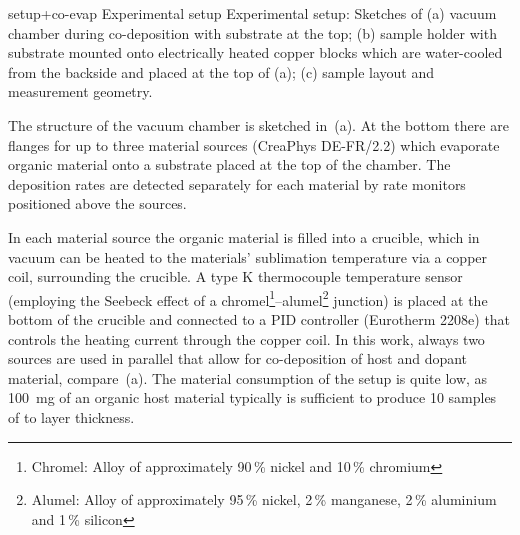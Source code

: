 \cBildDraw
{setup+co-evap}
{Experimental setup}
{Experimental setup: Sketches of (a) vacuum chamber during co-deposition with substrate at the top; (b) sample holder with substrate mounted onto electrically heated copper blocks which are water-cooled from the backside and placed at the top of (a); (c) sample layout and measurement geometry.}

The structure of the vacuum chamber is sketched in \,(a). At the bottom there are flanges for up to three material sources (CreaPhys DE-FR/2.2) which evaporate organic material onto a substrate placed at the top of the chamber. The deposition rates are detected separately for each material by rate monitors positioned above the sources.

In each material source the organic material is filled into a crucible, which in vacuum can be heated to the materials' sublimation temperature via a copper coil, surrounding the crucible. A type K thermocouple temperature sensor (employing the Seebeck effect of a chromel\footnote{Chromel: Alloy of approximately 90\,\% nickel and 10\,\% chromium}--alumel\footnote{Alumel: Alloy of approximately 95\,\% nickel, 2\,\% manganese, 2\,\% aluminium and 1\,\% silicon} junction) is placed at the bottom of the crucible and connected to a PID controller (Eurotherm 2208e) that controls the heating current through the copper coil.
In this work, always two sources are used in parallel that allow for co-deposition of host and dopant material, compare \,(a). The material consumption of the setup is quite low, as \SI{100}{\milli\gram} of an organic host material typically is sufficient to produce 10 samples of  to  layer thickness.

